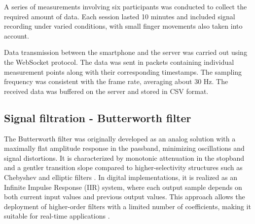 \documentclass{citask}
\begin{document}
A series of measurements involving six participants was conducted to collect the required amount of data. Each session lasted 10 minutes and included signal recording under varied conditions, with small finger movements also taken into account.

Data transmission between the smartphone and the server was carried out using the WebSocket protocol. The data was sent in packets containing individual measurement points along with their corresponding timestamps. The sampling frequency was consistent with the frame rate, averaging about 30 Hz. The received data was buffered on the server and stored in CSV format.

\subsection{Signal filtration - Butterworth filter}
The Butterworth filter was originally developed as an analog solution with a maximally flat amplitude response in the passband, minimizing oscillations and signal distortions. It is characterized by monotonic attenuation in the stopband and a gentler transition slope compared to higher-selectivity structures such as Chebyshev and elliptic filters \cite{22}. In digital implementations, it is realized as an Infinite Impulse Response (IIR) system, where each output sample depends on both current input values and previous output values. This approach allows the deployment of higher-order filters with a limited number of coefficients, making it suitable for real-time applications \cite{23}.
\end{document}
